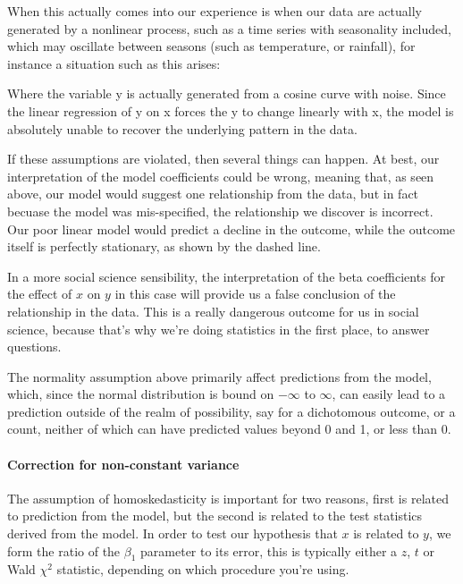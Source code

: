 \documentclass[
]{article}
\begin{document}
When this actually comes into our experience is when our data are actually generated by a nonlinear process, such as a time series with seasonality included, which may oscillate between seasons (such as temperature, or rainfall), for instance a situation such as this arises:

Where the variable y is actually generated from a cosine curve with noise. Since the linear regression of y on x forces the y to change linearly with x, the model is absolutely unable to recover the underlying pattern in the data.

If these assumptions are violated, then several things can happen. At best, our interpretation of the model coefficients could be wrong, meaning that, as seen above, our model would suggest one relationship from the data, but in fact becuase the model was mis-specified, the relationship we discover is incorrect. Our poor linear model would predict a decline in the outcome, while the outcome itself is perfectly stationary, as shown by the dashed line.

In a more social science sensibility, the interpretation of the beta coefficients for the effect of \(x\) on \(y\) in this case will provide us a false conclusion of the relationship in the data. This is a really dangerous outcome for us in social science, because that's why we're doing statistics in the first place, to answer questions.

The normality assumption above primarily affect predictions from the model, which, since the normal distribution is bound on \(-\infty\) to \(\infty\), can easily lead to a prediction outside of the realm of possibility, say for a dichotomous outcome, or a count, neither of which can have predicted values beyond 0 and 1, or less than 0.

\hypertarget{correction-for-non-constant-variance}{%
\paragraph{Correction for non-constant variance}\label{correction-for-non-constant-variance}}

The assumption of homoskedasticity is important for two reasons, first is related to prediction from the model, but the second is related to the test statistics derived from the model. In order to test our hypothesis that \(x\) is related to \(y\), we form the ratio of the \(\beta_1\) parameter to its error, this is typically either a \(z\), \(t\) or Wald \(\chi^2\) statistic, depending on which procedure you're using.
\end{document}
